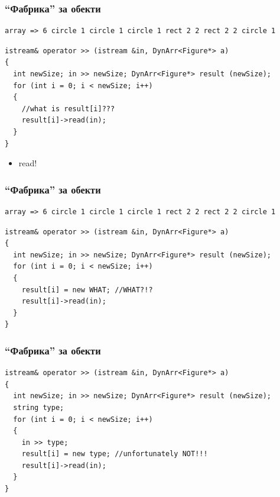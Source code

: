 \documentclass{beamer}
\begin{document}
\begin{frame}[fragile]
\frametitle{``Фабрика'' за обекти}


\begin{flushleft}
\begin{lstlisting}
array => 6 circle 1 circle 1 circle 1 rect 2 2 rect 2 2 circle 1
\end{lstlisting}
\end{flushleft}

\begin{flushleft}
\begin{lstlisting}
istream& operator >> (istream &in, DynArr<Figure*> a)
{
  int newSize; in >> newSize; DynArr<Figure*> result (newSize);
  for (int i = 0; i < newSize; i++)
  {
    //what is result[i]???
    result[i]->read(in);
  }
}
\end{lstlisting}
\end{flushleft}
\begin{itemize}
  \item read!
\end{itemize}

\end{frame}



\begin{frame}[fragile]
\frametitle{``Фабрика'' за обекти}


\begin{flushleft}
\begin{lstlisting}
array => 6 circle 1 circle 1 circle 1 rect 2 2 rect 2 2 circle 1
\end{lstlisting}
\end{flushleft}

\begin{flushleft}
\begin{lstlisting}
istream& operator >> (istream &in, DynArr<Figure*> a)
{
  int newSize; in >> newSize; DynArr<Figure*> result (newSize);
  for (int i = 0; i < newSize; i++)
  {
    result[i] = new WHAT; //WHAT?!?
    result[i]->read(in);
  }
}
\end{lstlisting}
\end{flushleft}


\end{frame}







\begin{frame}[fragile]
\frametitle{``Фабрика'' за обекти}


\begin{flushleft}
\begin{lstlisting}
istream& operator >> (istream &in, DynArr<Figure*> a)
{
  int newSize; in >> newSize; DynArr<Figure*> result (newSize);
  string type;
  for (int i = 0; i < newSize; i++)
  {
    in >> type;
    result[i] = new type; //unfortunately NOT!!!
    result[i]->read(in);
  }
}
\end{lstlisting}
\end{flushleft}



\end{frame}
\end{document}
